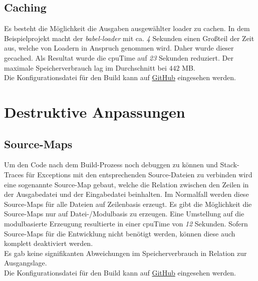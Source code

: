 \documentclass[11pt]{report}
\begin{document}
    		\subsection{Caching}
    			Es besteht die Möglichkeit die Ausgaben ausgewählter \Gls{loader} zu cachen. In dem Beispielprojekt macht der \emph{babel-loader} mit ca. \emph{4} Sekunden einen Großteil der Zeit aus, welche von Loadern in Anspruch genommen wird. Daher wurde dieser gecached. Als Resultat wurde die \Gls{cpuTime} auf \emph{23} Sekunden reduziert. Der maximale Speicherverbrauch lag im Durchschnitt bei $442$ MB.\\
    			Die Konfigurationsdatei für den Build kann auf \href{https://github.com/TexNAK/WebBundlerOptimization/commit/370e3233461f32c823e6c794ad52179e15391ebc#diff-1fb5683b1e7adbcee273b7f9f9a08a22}{GitHub} eingesehen werden.
    			

    	\section{Destruktive Anpassungen}
    		\subsection{Source-Maps}
    			Um den Code nach dem Build-Prozess noch debuggen zu können und Stack-Traces für Exceptions mit den entsprechenden Source-Dateien zu verbinden wird eine sogenannte Source-Map gebaut, welche die Relation zwischen den Zeilen in der Ausgabedatei und der Eingabedatei beinhalten. Im Normalfall werden diese Source-Maps für alle Dateien auf Zeilenbasis erzeugt. Es gibt die Möglichkeit die Source-Maps nur auf Datei-/Modulbasis zu erzeugen. Eine Umstellung auf die modulbasierte Erzeugung resultierte in einer \Gls{cpuTime} von \emph{12} Sekunden. Sofern Source-Maps für die Entwicklung nicht benötigt werden, können diese auch komplett deaktiviert werden.\\
    			Es gab keine signifikanten Abweichungen im Speicherverbrauch in Relation zur Ausgangslage.\\
    			Die Konfigurationsdatei für den Build kann auf \href{https://github.com/TexNAK/WebBundlerOptimization/compare/master...destr_cheapSourceMaps#diff-1fb5683b1e7adbcee273b7f9f9a08a22}{GitHub} eingesehen werden.
\end{document}
